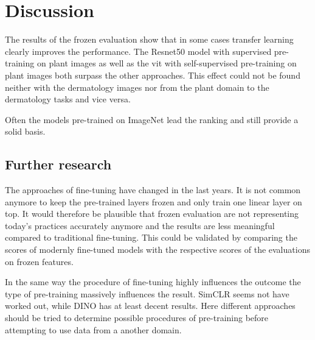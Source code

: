 \chapter{Discussion}\label{chapter_5}

The results of the frozen evaluation show that in some cases transfer learning clearly improves the performance.
The Resnet50 model with supervised pre-training on plant images as well as the \gls{vit} with self-supervised pre-training on plant images both surpass the other approaches.
This effect could not be found neither with the dermatology images nor from the plant domain to the dermatology tasks and vice versa.

Often the models pre-trained on ImageNet lead the ranking and still provide a solid basis.


\section{Further research}
The approaches of fine-tuning have changed in the last years. 
It is not common anymore to keep the pre-trained layers frozen and only train one linear layer on top. 
It would therefore be plausible that frozen evaluation are not representing today's practices accurately anymore and the results are less meaningful compared to traditional fine-tuning.
This could be validated by comparing the scores of modernly fine-tuned models with the respective scores of the evaluations on frozen features.

In the same way the procedure of fine-tuning highly influences the outcome the type of pre-training massively influences the result. 
SimCLR seems not have worked out, while DINO has at least decent results. 
Here different approaches should be tried to determine possible procedures of pre-training before attempting to use data from a another domain.







